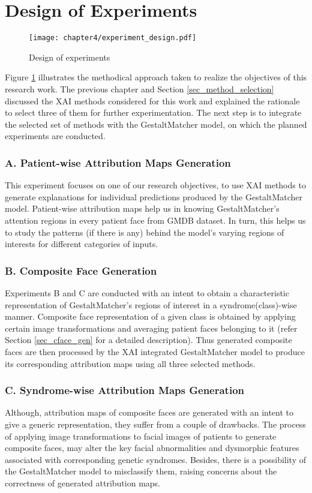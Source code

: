 \documentclass[../report.tex]{subfiles}
\begin{document}
    \section{Design of Experiments}\label{sec_exp_design}
    \begin{figure}[ht]
    	\hspace*{-0.5cm}      
       	\texttt{[image: chapter4/experiment\_design.pdf]}
        	\caption{Design of experiments}
    	    	\label{fig_exp_design}
    \end{figure}
    Figure \ref{fig_exp_design} illustrates the methodical approach taken to realize the objectives of this research work. The previous chapter and Section \ref{sec_method_selection} discussed the XAI methods considered for this work and explained the rationale to select three of them for further experimentation. The next step is to integrate the selected set of methods with the GestaltMatcher model, on which the planned experiments are conducted. 

    \subsubsection{A. Patient-wise Attribution Maps Generation}
    This experiment focuses on one of our research objectives, to use XAI methods to generate explanations for individual predictions produced by the GestaltMatcher model. 
    Patient-wise attribution maps help us in knowing GestaltMatcher's attention regions in every patient face from GMDB dataset. In turn, this helps us to study the patterns (if there is any) behind the model's varying regions of interests for different categories of inputs.
    \subsubsection{B. Composite Face Generation}
    Experiments B and C are conducted with an intent to obtain a characteristic representation of GestaltMatcher's regions of interest in a syndrome(class)-wise manner. Composite face representation of a given class is obtained by applying certain image transformations and averaging patient faces belonging to it (refer Section \ref{sec_cface_gen} for a detailed description). Thus generated composite faces are then processed by the XAI integrated GestaltMatcher model to produce its corresponding attribution maps using all three selected methods.
    \subsubsection{C. Syndrome-wise Attribution Maps Generation}
    Although, attribution maps of composite faces are generated with an intent to give a generic representation, they suffer from a couple of drawbacks. The process of applying image transformations to facial images of patients to generate composite faces, may alter the key facial abnormalities and dysmorphic features associated with corresponding genetic syndromes. Besides, there is a possibility of the GestaltMatcher model to misclassify them, raising concerns about the correctness of generated attribution maps. 
    
\end{document}
